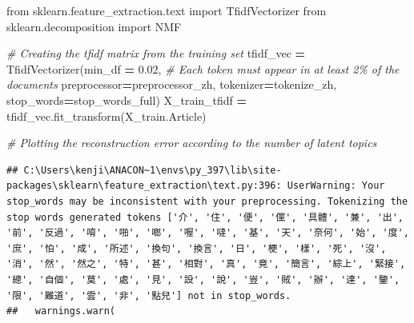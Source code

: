 \documentclass[a4paper, oneside]{report}
\newenvironment{Shaded}{\begin{snugshade}}{\end{snugshade}}
\newcommand{\CommentTok}[1]{\textcolor[rgb]{0.56,0.35,0.01}{\textit{#1}}}
\newcommand{\ControlFlowTok}[1]{\textcolor[rgb]{0.13,0.29,0.53}{\textbf{#1}}}
\newcommand{\FloatTok}[1]{\textcolor[rgb]{0.00,0.00,0.81}{#1}}
\newcommand{\ImportTok}[1]{#1}
\newcommand{\KeywordTok}[1]{\textcolor[rgb]{0.13,0.29,0.53}{\textbf{#1}}}
\newcommand{\NormalTok}[1]{#1}
\newcommand{\OperatorTok}[1]{\textcolor[rgb]{0.81,0.36,0.00}{\textbf{#1}}}
\newcommand{\StringTok}[1]{\textcolor[rgb]{0.31,0.60,0.02}{#1}}
\newcommand{\VerbatimStringTok}[1]{\textcolor[rgb]{0.31,0.60,0.02}{#1}}
\renewenvironment{Shaded}
{
  \vspace{4pt}%
  \begin{snugshade}%
}{%
  \end{snugshade}%
  \vspace{4pt}%
}
\begin{document}
\begin{Shaded}
\end{Shaded}

\begin{Shaded}
\begin{Highlighting}[]
\ImportTok{from}\NormalTok{ sklearn.feature\_extraction.text }\ImportTok{import}\NormalTok{ TfidfVectorizer}
\ImportTok{from}\NormalTok{ sklearn.decomposition }\ImportTok{import}\NormalTok{ NMF}

\CommentTok{\# Creating the tfidf matrix from the training set}
\NormalTok{tfidf\_vec }\OperatorTok{=}\NormalTok{ TfidfVectorizer(min\_df }\OperatorTok{=} \FloatTok{0.02}\NormalTok{,  }\CommentTok{\# Each token must appear in at least 2\% of the documents}
\NormalTok{                            preprocessor}\OperatorTok{=}\NormalTok{preprocessor\_zh, }
\NormalTok{                            tokenizer}\OperatorTok{=}\NormalTok{tokenize\_zh, }
\NormalTok{                            stop\_words}\OperatorTok{=}\NormalTok{stop\_words\_full)}
\NormalTok{X\_train\_tfidf }\OperatorTok{=}\NormalTok{ tfidf\_vec.fit\_transform(X\_train.Article)}

\CommentTok{\# Plotting the reconstruction error according to the number of latent topics}
\end{Highlighting}
\end{Shaded}

\begin{verbatim}
## C:\Users\kenji\ANACON~1\envs\py_397\lib\site-packages\sklearn\feature_extraction\text.py:396: UserWarning: Your stop_words may be inconsistent with your preprocessing. Tokenizing the stop words generated tokens ['介', '住', '便', '儻', '具體', '兼', '出', '前', '反過', '唷', '啪', '啷', '喔', '噠', '基', '天', '奈何', '始', '度', '庶', '怕', '成', '所述', '換句', '換言', '日', '梗', '樣', '死', '沒', '消', '然', '然之', '特', '甚', '相對', '真', '竟', '簡言', '綜上', '緊接', '總', '自個', '莫', '處', '見', '設', '說', '豈', '賊', '辦', '達', '鑒', '限', '難道', '雲', '非', '點兒'] not in stop_words.
##   warnings.warn(
\end{verbatim}
\end{document}
